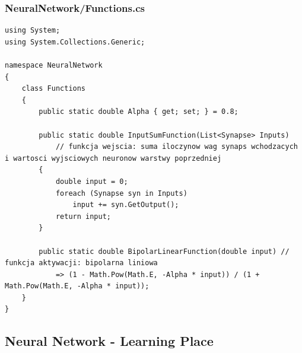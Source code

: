 \documentclass[12pt,a4paper]{article}
\begin{document}
	\subsubsection*{NeuralNetwork/Functions.cs}
	\begin{lstlisting}
using System;
using System.Collections.Generic;

namespace NeuralNetwork
{
    class Functions
    {
        public static double Alpha { get; set; } = 0.8;

        public static double InputSumFunction(List<Synapse> Inputs) 
            // funkcja wejscia: suma iloczynow wag synaps wchodzacych i wartosci wyjsciowych neuronow warstwy poprzedniej
        {
            double input = 0;
            foreach (Synapse syn in Inputs) 
                input += syn.GetOutput();
            return input;
        }

        public static double BipolarLinearFunction(double input) // funkcja aktywacji: bipolarna liniowa
            => (1 - Math.Pow(Math.E, -Alpha * input)) / (1 + Math.Pow(Math.E, -Alpha * input));
    }
}
	\end{lstlisting}

\vspace{20pt}
    \subsection*{Neural Network - Learning Place}
\end{document}
